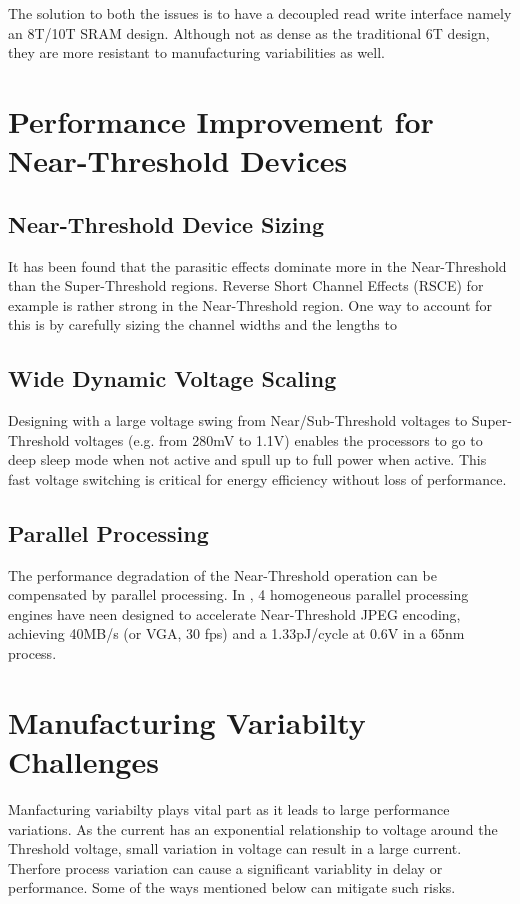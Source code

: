 \documentclass[conference]{IEEEtran}
\begin{document}
The solution to both the issues is to have a decoupled read write interface namely an 8T/10T SRAM design. Although not as dense as the traditional 6T design, they are more resistant to manufacturing variabilities as well.

\section{Performance Improvement for Near-Threshold Devices} \label{sec:Perf_challenges}

\subsection{Near-Threshold Device Sizing}
It has been found that the parasitic effects dominate more in the Near-Threshold than the Super-Threshold regions. Reverse Short Channel Effects (RSCE) for example is rather strong in the Near-Threshold region. One way to account for this is by carefully sizing the channel widths and the lengths to 
\subsection{Wide Dynamic Voltage Scaling}
Designing with a large voltage swing from Near/Sub-Threshold voltages to Super-Threshold voltages (e.g. from 280mV to 1.1V) enables the processors to go to deep sleep mode when not active and spull up to full power when active. This fast voltage switching is critical for energy efficiency without loss of performance.
\subsection{Parallel Processing}
The performance degradation of the Near-Threshold operation can be compensated by parallel processing. In \cite{b8}, 4 homogeneous parallel processing engines have neen designed to accelerate Near-Threshold JPEG encoding, achieving 40MB/s (or VGA, 30 fps) and a 1.33pJ/cycle at 0.6V in a 65nm process.

\section{Manufacturing Variabilty Challenges} \label{sec:Variablity}
Manfacturing variabilty plays vital part as it leads to large performance variations. As the current has an exponential relationship to voltage around the Threshold voltage, small variation in voltage can result in a large current. Therfore process variation can cause a significant variablity in delay or performance. Some of the ways mentioned below can mitigate such risks.
\end{document}
